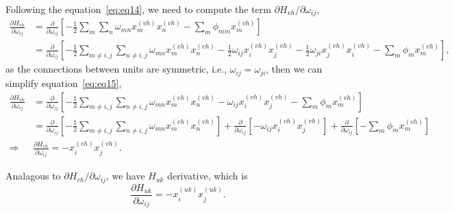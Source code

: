 Following the equation~\ref{eq:eq14}, we need to compute the term $\partial H_{vh}/\partial \omega_{ij}$,
\begin{equation}
  \begin{split}
      \frac{\partial H_{vh}}{\partial \omega_{ij}} & = \frac{\partial}{\partial \omega_{ij}} \left[- \frac{1}{2} \sum_{m} \sum_{n} \omega_{mn} x^{(vh)}_{m} x^{(vh)}_{n} - \sum_{m} \phi_{mm} x^{(vh)}_{m} \right] \\
                                                   & = \frac{\partial}{\partial \omega_{ij}} \left[- \frac{1}{2} \sum_{m \neq i,j} \sum_{n \neq i,j} \omega_{mn} x^{(vh)}_{m} x^{(vh)}_{n} - \frac{1}{2} \omega_{ij} x^{(vh)}_{i} x^{(vh)}_{j} - \frac{1}{2} \omega_{ji} x^{(vh)}_{j} x^{(vh)}_{i} - \sum_{m} \phi_{m} x^{(vh)}_{m} \right],
  \end{split}
  \label{eq:eq15}
\end{equation}
as the connections between units are symmetric, i.e., $\omega_{ij} = \omega_{ji}$, then we can simplify equation~\ref{eq:eq15},
\begin{equation}
  \begin{split}
    \frac{\partial H_{vh}}{\partial \omega_{ij}} & = \frac{\partial}{\partial \omega_{ij}} \left[- \frac{1}{2} \sum_{m \neq i,j} \sum_{n \neq i,j} \omega_{mn} x^{(vh)}_{m} x^{(vh)}_{n} - \omega_{ij} x^{(vh)}_{i} x^{(vh)}_{j} - \sum_{m} \phi_{m} x^{(vh)}_{m} \right] \\
    & = \frac{\partial}{\partial \omega_{ij}} \left[- \frac{1}{2} \sum_{m \neq i,j} \sum_{n \neq i,j} \omega_{mn} x^{(vh)}_{m} x^{(vh)}_{n} \right] + \frac{\partial}{\partial \omega_{ij}} \left[- \omega_{ij} x^{(vh)}_{i} x^{(vh)}_{j} \right] + \frac{\partial}{\partial \omega_{ij}} \left[- \sum_{m} \phi_{m} x^{(vh)}_{m} \right] \\
    \Rightarrow & \frac{\partial H_{vh}}{\partial \omega_{ij}} = - x^{(vh)}_{i} x^{(vh)}_{j}.
  \end{split}
  \label{eq:eq16}
\end{equation}

Analagous to $\partial H_{vh}/\partial \omega_{ij}$, we have $H_{uk}$ derivative, which is
\begin{equation}
  \frac{\partial H_{uk}}{\partial \omega_{ij}} = - x^{(uk)}_{i} x^{(uk)}_{j}.
  \label{eq:eq17}
\end{equation}

